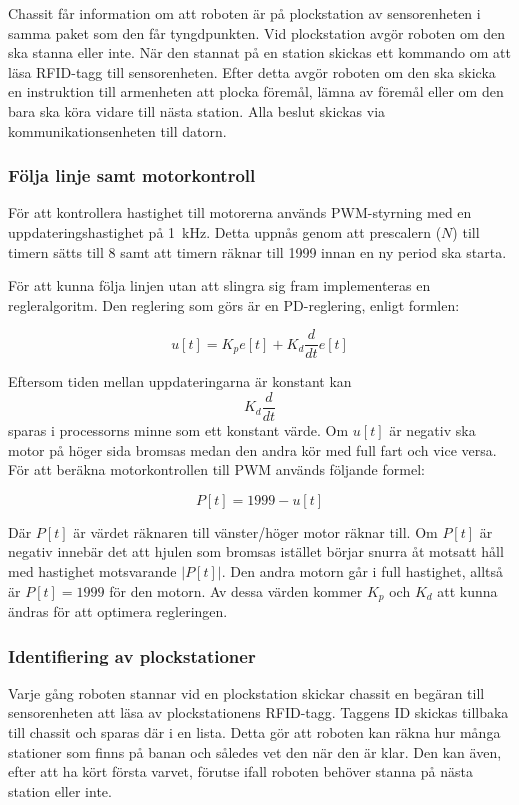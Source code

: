 Chassit får information om att roboten är på plockstation av sensorenheten i samma paket som den får tyngdpunkten. Vid plockstation avgör roboten om den ska stanna eller inte. När den stannat på en station skickas ett kommando om att läsa RFID-tagg till sensorenheten. Efter detta avgör roboten om den ska skicka en instruktion till armenheten att  plocka föremål, lämna av föremål eller om den bara ska köra vidare till nästa station. Alla beslut skickas via kommunikationsenheten till datorn.


\subsubsection{Följa linje samt motorkontroll}
\label{följalinje}

För att kontrollera hastighet till motorerna används PWM-styrning med en uppdateringshastighet på 1~kHz. Detta uppnås genom att prescalern ($N$) till timern sätts till 8 samt att timern räknar till 1999 innan en ny period ska starta. 

För att kunna följa linjen utan att slingra sig fram implementeras en regleralgoritm. Den reglering som görs är en PD-reglering, enligt formlen:

$$u[t] = K_{p}e[t] + K_{d}\frac{d}{dt}e[t]$$

Eftersom tiden mellan uppdateringarna är konstant kan $$ K_{d}\frac{d}{dt}$$ sparas i processorns minne som ett konstant värde. Om $u[t]$ är negativ ska motor på höger sida  bromsas medan den andra kör med full fart och vice versa. För att beräkna motorkontrollen till PWM används följande formel:

$$P[t] = 1999 - u[t]$$

Där $P[t]$ är värdet räknaren till vänster/höger motor räknar till. Om $P[t]$ är negativ innebär det att hjulen som bromsas istället börjar snurra åt motsatt håll med hastighet motsvarande $|P[t]|$. Den andra motorn går i full hastighet, alltså är $P[t] = 1999$ för den motorn. Av dessa värden kommer $K_{p}$ och $K_{d}$ att kunna ändras för att optimera regleringen.


\subsubsection{Identifiering av plockstationer}

Varje gång roboten stannar vid en plockstation skickar chassit en begäran till sensorenheten att läsa av plockstationens RFID-tagg. Taggens ID skickas tillbaka till chassit och sparas där i en lista. Detta gör att roboten kan räkna hur många stationer som finns på banan och således vet den när den är klar. Den kan även, efter att ha kört första varvet, förutse ifall roboten behöver stanna på nästa station eller inte. 


